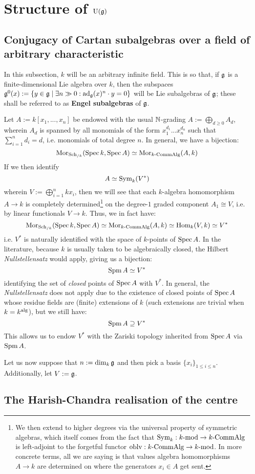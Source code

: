 \section{Structure of \texorpdfstring{$\mathrm{U}(\mathfrak{g})$}{}}
    \subsection{Conjugacy of Cartan subalgebras over a field of arbitrary characteristic}
        \begin{convention}
            In this subsection, $k$ will be an arbitrary infinite field. This is so that, if $\mathfrak{g}$ is a finite-dimensional Lie algebra over $k$, then the subspaces $\mathfrak{g}^0(x) := \{ y \in \mathfrak{g} \mid \exists n \gg 0: \mathrm{ad}_{\mathfrak{g}}(x)^n \cdot y = 0 \}$ will be Lie subalgebras of $\mathfrak{g}$; these shall be referred to as \textbf{Engel subalgebras} of $\mathfrak{g}$.
        \end{convention}

        Let $A := k[x_1, ..., x_n]$ be endowed with the usual $\mathbb{N}$-grading $A := \bigoplus_{d \geq 0} A_d$, wherein $A_d$ is spanned by all monomials of the form $x_1^{d_1} ... x_n^{d_n}$ such that $\sum_{i = 1}^n d_i = d$, i.e. monomials of total degree $n$. In general, we have a bijection:
            $$\mathrm{Mor}_{\mathrm{Sch}_{/k}}(\operatorname{Spec} k, \operatorname{Spec} A) \simeq \mathrm{Mor}_{k\text{-}\mathrm{Comm}\mathrm{Alg}}(A, k)$$
        If we then identify
            $$A \simeq \mathrm{Sym}_k(V^*)$$
        wherein $V := \bigoplus_{i = 1}^n kx_i$, then we will see that each $k$-algebra homomorphism $A \to k$ is completely determined\footnote{We then extend to higher degrees via the universal property of symmetric algebras, which itself comes from the fact that $\mathrm{Sym}_k: k\text{-}\mathrm{mod} \to k\text{-}\mathrm{Comm}\mathrm{Alg}$ is left-adjoint to the forgetful functor $\mathrm{oblv}: k\text{-}\mathrm{Comm}\mathrm{Alg} \to k\text{-}\mathrm{mod}$. In more concrete terms, all we are saying is that values algebra homomorphisms $A \to k$ are determined on where the generators $x_i \in A$ get sent.} on the degree-$1$ graded component $A_1 \cong V$, i.e. by linear functionals $V \to k$. Thus, we in fact have:
            $$\mathrm{Mor}_{\mathrm{Sch}_{/k}}(\operatorname{Spec} k, \operatorname{Spec} A) \simeq \mathrm{Mor}_{k\text{-}\mathrm{Comm}\mathrm{Alg}}(A, k) \simeq \mathrm{Hom}_k(V, k) \simeq V^*$$
        i.e. $V^*$ is naturally identified with the space of $k$-points of $\operatorname{Spec} A$. In the literature, because $k$ is usually taken to be algebraically closed, the Hilbert \textit{Nullstellensatz} would apply, giving us a bijection:
            $$\operatorname{Spm} A \simeq V^*$$
        identifying the set of \textit{closed} points of $\operatorname{Spec} A$ with $V^*$. In general, the \textit{Nullstellensatz} does not apply due to the existence of closed points of $\operatorname{Spec} A$ whose residue fields are (finite) extensions of $k$ (such extensions are trivial when $k = k^{\mathrm{alg}}$), but we still have:
            $$\operatorname{Spm} A \supseteq V^*$$
        This allows us to endow $V^*$ with the Zariski topology inherited from $\operatorname{Spec} A$ via $\operatorname{Spm} A$.

        Let us now suppose that $n := \dim_k \mathfrak{g}$ and then pick a basis $\{x_i\}_{1 \leq i \leq n}$. Additionally, let $V := \mathfrak{g}$.

    \subsection{The Harish-Chandra realisation of the centre}
        